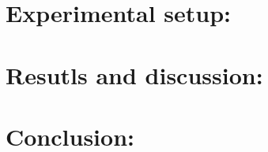 \documentclass[12pt,a4paper] {article}
\begin{document}
	\section{Experimental setup:}




	\section{Resutls and discussion:}


	\section{Conclusion:}
\end{document}
